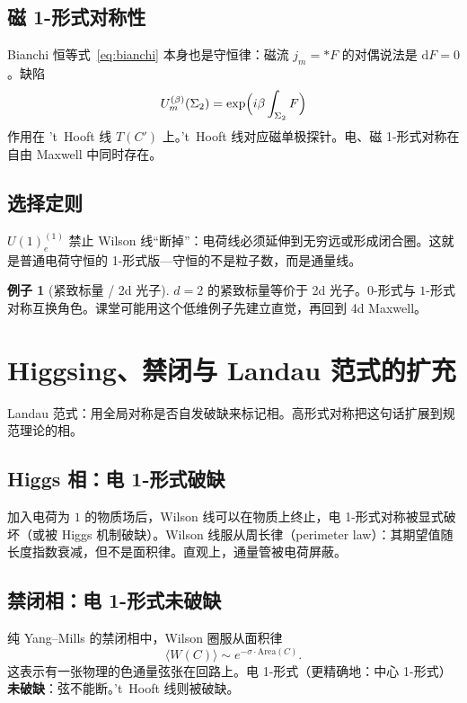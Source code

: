 \documentclass[11pt,a4paper]{article}
\theoremstyle{definition}
\newtheorem{example}{例子}[section]
\theoremstyle{plain}
\theoremstyle{remark}
\newcommand{\dd}{\mathrm{d}}
\begin{document}
\subsection{磁 1-形式对称性}

Bianchi 恒等式~\eqref{eq:bianchi} 本身也是守恒律：磁流 $j_m={*}F$ 的对偶说法是 $\dd F=0$。缺陷
\begin{equation}
  U_m^{(\beta)}(\Sigma_2)=\exp\Bigl(i\beta\int_{\Sigma_2} F\Bigr)
\end{equation}
作用在 't~Hooft 线 $T(C')$ 上。't~Hooft 线对应磁单极探针。电、磁 1-形式对称在自由 Maxwell 中同时存在。

\subsection{选择定则}

$U(1)^{(1)}_e$ 禁止 Wilson 线``断掉''：电荷线必须延伸到无穷远或形成闭合圈。这就是普通电荷守恒的 1-形式版---守恒的不是粒子数，而是通量线。

\begin{example}[紧致标量 / 2d 光子]
$d=2$ 的紧致标量等价于 2d 光子。$0$-形式与 $1$-形式对称互换角色。课堂可能用这个低维例子先建立直觉，再回到 4d Maxwell。
\end{example}

\section{Higgsing、禁闭与 Landau 范式的扩充}
\label{sec:phases}

Landau 范式：用全局对称是否自发破缺来标记相。高形式对称把这句话扩展到规范理论的相。

\subsection{Higgs 相：电 1-形式破缺}

加入电荷为 $1$ 的物质场后，Wilson 线可以在物质上终止，电 1-形式对称被显式破坏（或被 Higgs 机制破缺）。Wilson 线服从周长律（perimeter law）：其期望值随长度指数衰减，但不是面积律。直观上，通量管被电荷屏蔽。

\subsection{禁闭相：电 1-形式未破缺}

纯 Yang--Mills 的禁闭相中，Wilson 圈服从面积律
\begin{equation}
  \langle W(C)\rangle\sim e^{-\sigma\cdot\mathrm{Area}(C)}.
\end{equation}
这表示有一张物理的色通量弦张在回路上。电 1-形式（更精确地：中心 1-形式）\textbf{未破缺}：弦不能断。't~Hooft 线则被破缺。
\end{document}
